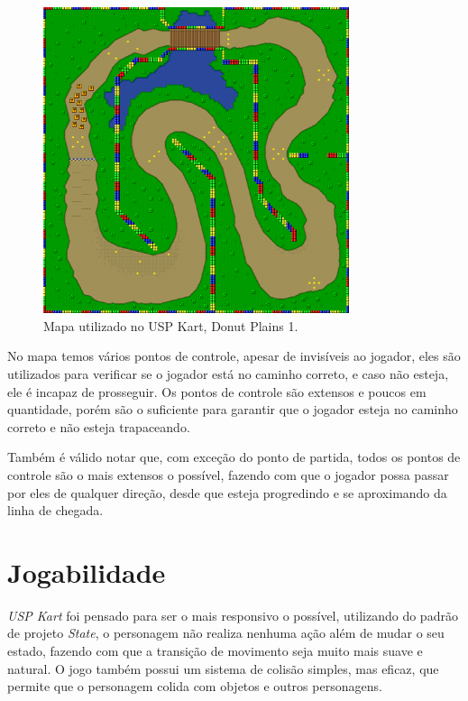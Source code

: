 \begin{figure}[H]
    \centering
    \includegraphics[width=0.8\textwidth]{figuras/Mapa.png}
    \caption{Mapa utilizado no USP Kart, Donut Plains 1. \cite{marioKart}}
    \label{fig:mapa}
\end{figure}


No mapa temos vários pontos de controle, apesar de invisíveis ao jogador, eles são utilizados para verificar se o jogador está no caminho correto, e caso não esteja, ele é incapaz de prosseguir. Os pontos de controle são extensos e poucos em quantidade, porém são o suficiente para garantir que o jogador esteja no caminho correto e não esteja trapaceando.

Também é válido notar que, com exceção do ponto de partida, todos os pontos de controle são o mais extensos o possível, fazendo com que o jogador possa passar por eles de qualquer direção, desde que esteja progredindo e se aproximando da linha de chegada. 

\section{Jogabilidade}

\textit{USP Kart} foi pensado para ser o mais responsivo o possível, utilizando do padrão de projeto \textit{State}, o personagem não realiza nenhuma ação além de mudar o seu estado, fazendo com que a transição de movimento seja muito mais suave e natural. O jogo também possui um sistema de colisão simples, mas eficaz, que permite que o personagem colida com objetos e outros personagens.

